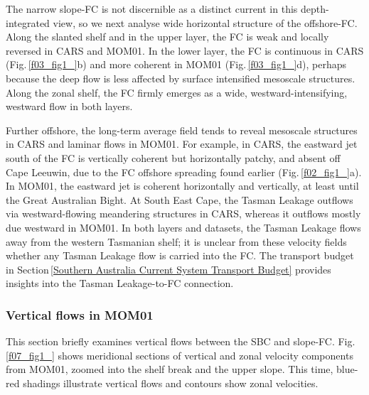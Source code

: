 \documentclass[preprint,3p,review,12pt]{elsarticle}
\begin{document}
The narrow slope-FC is not discernible as a distinct current in this depth-integrated view, so we next analyse wide horizontal structure of the offshore-FC. Along the slanted shelf and in the upper layer, the FC is weak and locally reversed in CARS and MOM01. In the lower layer, the FC is continuous in CARS (Fig.\,\ref{f03_fig1_}b) and more coherent in MOM01 (Fig.\,\ref{f03_fig1_}d), perhaps because the deep flow is less affected by surface intensified mesoscale structures. Along the zonal shelf, the FC firmly emerges as a wide, westward-intensifying, westward flow in both layers.

Further offshore, the long-term average field tends to reveal mesoscale structures in CARS and laminar flows in MOM01\@. For example, in CARS, the eastward jet south of the FC is vertically coherent but horizontally patchy, and absent off Cape Leeuwin, due to the FC offshore spreading found earlier (Fig.\,\ref{f02_fig1_}a). In MOM01, the eastward jet is coherent horizontally and vertically, at least until the Great Australian Bight. At South East Cape, the Tasman Leakage outflows via westward-flowing meandering structures in CARS, whereas it outflows mostly due westward in MOM01. In both layers and datasets, the Tasman Leakage flows away from the western Tasmanian shelf; it is unclear from these velocity fields whether any Tasman Leakage flow is carried into the FC. The transport budget in Section\,\ref{Southern Australia Current System Transport Budget} provides insights into the Tasman Leakage-to-FC connection.

\subsubsection{Vertical flows in MOM01} \label{Vertical flows in MOM01}
This section briefly examines vertical flows between the SBC and slope-FC\@. Fig.\,\ref{f07_fig1_} shows meridional sections of vertical and zonal velocity components from MOM01, zoomed into the shelf break and the upper slope. This time, blue-red shadings illustrate vertical flows and contours show zonal velocities.
\end{document}
